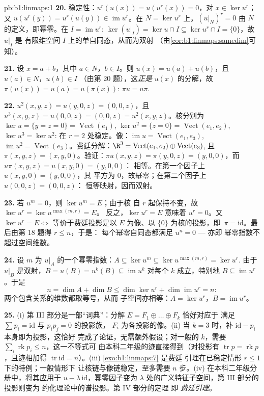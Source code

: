 \begin{solution}{pb:b1:linmaps:1}
\textbf{20.} 稳定性：$u^{r}(u(x)) = u(u^{r}(x)) = 0$，对 $x
\in \ker u^{r}$；又 $u(u^{r}(y)) = u^{r}(u(y)) \in
\operatorname{im} u^{r}$。在 $N = \ker u^{r}$ 上，$(u|_N)^{r} = 0$
由 $N$ 的定义，即幂零。在 $I = \operatorname{im}
u^{r}$: $\ker(u|_I) = \ker u \cap I \subseteq \ker u^{r} \cap I
= \{0\}$，故 $u|_I$ 是
有限维空间 $I$ 上的单自同态，从而为双射
（由\cref{cor:b1:linmaps:samedim}可知）。

\textbf{21.} 设 $x = a + b$，其中 $a \in N$，$b \in I$。则
$u(x) = u(a) + u(b)$，且 $u(a) \in N$，$u(b) \in I$
（由第 20 题），这\emph{正是} $u(x)$ 的分解，故
$\pi(u(x)) = u(a) = u(\pi(x))$: $\pi u = u\pi$.

\textbf{22.} $u^2(x,y,z) = u(y, 0, z) = (0, 0, z)$，且
$u^3(x,y,z) = u(0,0,z) = (0,0,z) = u^2(x,y,z)$。核分别为 $\ker u
= \{y = z = 0\} = \operatorname{Vect}(e_1)$, $\ker u^2 = \{z =
0\} = \operatorname{Vect}(e_1, e_2)$, $\ker u^3 = \ker u^2$:
在 $r = 2$ 处稳定。像：$\operatorname{im} u =
\operatorname{Vect}(e_1, e_3)$, $\operatorname{im} u^2 =
\operatorname{Vect}(e_3)$。费廷分解：$\R^3 =
\operatorname{Vect}(e_1, e_2) \oplus \operatorname{Vect}(e_3)$,
且 $\pi(x, y, z) = (x, y, 0)$。验证：$\pi u(x,y,z) = \pi(y, 0,
z) = (y, 0, 0)$，而 $u\pi(x,y,z) = u(x, y, 0) = (y, 0, 0)$：
相等。在第一个因子上 $u(x, y, 0) = (y, 0, 0)$，其
平方为 $0$，故幂零；在第二个因子上 $u(0,0,z) = (0,0,z)$：
恒等映射，因而双射。

\textbf{23.} 若 $u^m = 0$，则 $\ker u^m = E$；由于核
自 $r$ 起保持不变，故 $\ker u^{r} = \ker u^{\max(m, r)} = E$。
反之，$\ker u^{r} = E$ 意味着 $u^{r} = 0$。又 $\ker u^{r} =
E \iff$ 等价于费廷投影是以 $E$ 为像、以 $\{0\}$ 为核的投影，即\
$\pi = \mathrm{id}$。最后由第 18 题得 $r \leq n$，于是：
每个幂零自同态都满足 $u^{n} = 0$ --- 亦即
幂零指数不超过空间维数。

\textbf{24.} 设 $m$ 为 $u|_A$ 的一个幂零指数：$A
\subseteq \ker u^{m} \subseteq \ker u^{\max(m,r)} = \ker u^{r}$.
由于 $u|_B$ 是双射，$B = u(B) = u^{k}(B) \subseteq
\operatorname{im} u^{k}$ 对每个 $k$ 成立，特别地 $B
\subseteq \operatorname{im} u^{r}$。于是
\[
n = \dim A + \dim B \leq \dim\ker u^{r} +
\dim\operatorname{im} u^{r} = n :
\]
两个包含关系的维数都取等号，从而
子空间亦相等：$A = \ker u^{r}$，$B = \operatorname{im} u^{r}$。

\textbf{25.} (i) 第 III 部分是一部“词典”：分解 $E = F_1
\oplus \dots \oplus F_k$ 恰好对应于
满足 $\sum p_i = \mathrm{id}$ 与 $p_i p_j = 0$ 的投影族，
$F_i$ 为各投影的像。(ii) 当 $k = 3$ 时，补
$\mathrm{id} - p_i$ 本身即为投影，这恰好
完成了论证，无需额外假设；对一般的 $k$，需要
$\sum_i \operatorname{rk} p_i \leq n$，这一不等式可
由本科二年级的迹直接得到（对投影有 $\operatorname{tr} p = \operatorname{rk}
p$，且迹相加得 $\operatorname{tr}
\mathrm{id} = n$）。(iii) \cref{exo:b1:linmaps:7} 是费廷
引理在已稳定情形 $r \leq 1$ 下的特例；一般情形下
让核链与像链稳定，至多需要 $n$
步。(iv) 在本科二年级分册中，将其应用于 $u - \lambda\,
\mathrm{id}$，幂零因子变为
$\lambda$ 处的广义特征子空间，第 III 部分的投影则变为
约化理论中的谱投影。第 IV 部分的定理
即 \emph{费廷引理}。
\end{solution}
